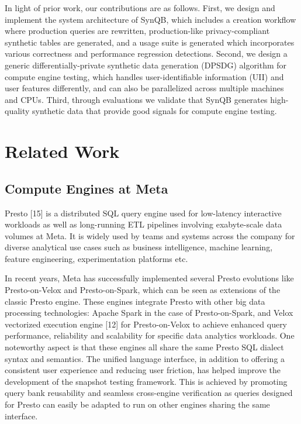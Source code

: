 \documentclass[11pt]{article}
\begin{document}
In light of prior work, our contributions are as follows. First, we
design and implement the system architecture of SynQB, which
includes a creation workflow where production queries are rewritten,
production-like privacy-compliant synthetic tables are generated,
and a usage suite is generated which incorporates various
correctness and performance regression detections. Second, we
design a generic differentially-private synthetic data generation
(DPSDG) algorithm for compute engine testing, which handles
user-identifiable information (UII) and user features differently,
and can also be parallelized across multiple machines and CPUs. Third,
through evaluations we validate that SynQB generates high-quality
synthetic data that provide good signals for compute engine testing.

\section{Related Work}

\subsection{Compute Engines at Meta}
Presto [15] is a distributed SQL query engine used for low-latency
interactive workloads as well as long-running ETL pipelines involving
exabyte-scale data volumes at Meta. It is widely used by teams
and systems across the company for diverse analytical use cases
such as business intelligence, machine learning, feature engineering,
experimentation platforms etc.

In recent years, Meta has successfully implemented several Presto
evolutions like Presto-on-Velox and Presto-on-Spark, which can be
seen as extensions of the classic Presto engine. These engines integrate
Presto with other big data processing technologies: Apache
Spark in the case of Presto-on-Spark, and Velox vectorized execution
engine [12] for Presto-on-Velox to achieve enhanced query
performance, reliability and scalability for specific data analytics
workloads. One noteworthy aspect is that these engines all share
the same Presto SQL dialect syntax and semantics. The unified language
interface, in addition to offering a consistent user experience
and reducing user friction, has helped improve the development
of the snapshot testing framework. This is achieved by promoting
query bank reusability and seamless cross-engine verification as
queries designed for Presto can easily be adapted to run on other
engines sharing the same interface.
\end{document}
